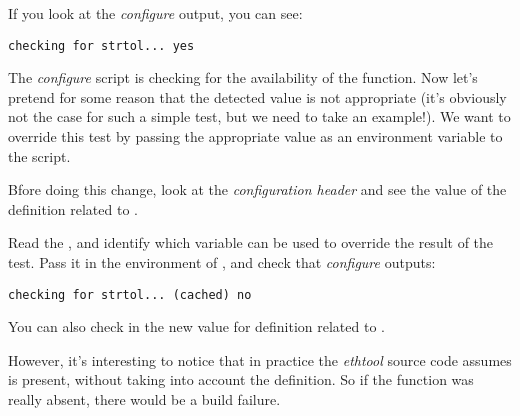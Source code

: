 If you look at the {\em configure} output, you can see:

\begin{verbatim}
checking for strtol... yes
\end{verbatim}

The {\em configure} script is checking for the availability of the
 function. Now let's pretend for some reason that the
detected value is not appropriate (it's obviously not the case for
such a simple test, but we need to take an example!). We want to
override this test by passing the appropriate value as an environment
variable to the  script.

Bfore doing this change, look at the
 {\em configuration header} and see the value of the
definition related to .

Read the , and identify which variable can be used to
override the result of the  test. Pass it in the
environment of , and check that {\em configure}
outputs:

\begin{verbatim}
checking for strtol... (cached) no
\end{verbatim}

You can also check in  the new value for definition
related to .

However, it's interesting to notice that in practice the {\em ethtool}
source code assumes  is present, without taking into
account the  definition. So if the function was
really absent, there would be a build failure.
